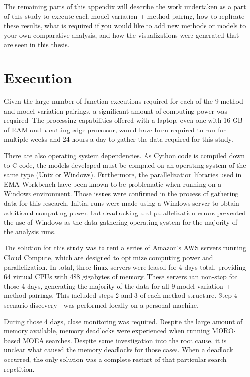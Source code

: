 The remaining parts of this appendix will describe the work undertaken as a part of this study to execute each model variation + method pairing, how to replicate these results, what is required if you would like to add new methods or models to your own comparative analysis, and how the visualizations were generated that are seen in this thesis. 

\section{Execution}
Given the large number of function executions required for each of the 9 method and model variation pairings, a significant amount of computing power was required. The processing capabilities offered with a laptop, even one with 16 GB of RAM and a cutting edge processor, would have been required to run for multiple weeks and 24 hours a day to gather the data required for this study. 

There are also operating system dependencies. As Cython code is compiled down to C code, the models developed must be compiled on an operating system of the same type (Unix or Windows). Furthermore, the parallelization libraries used in EMA Workbench have been known to be problematic when running on a Windows environment. Those issues were confirmed in the process of gathering data for this research. Initial runs were made using a Windows server to obtain additional computing power, but deadlocking and parallelization errors prevented the use of Windows as the data gathering operating system for the majority of the analysis runs. 

The solution for this study was to rent a series of Amazon's AWS servers running Cloud Compute, which are designed to optimize computing power and parallelization. In total, three linux servers were leased for 4 days total, providing 64 virtual CPUs with 488 gigabytes of memory. These servers ran non-stop for those 4 days, generating the majority of the data for all 9 model variation + method pairings. This included steps 2 and 3 of each method structure. Step 4 - scenario discovery - was performed locally on a personal machine. 

During those 4 days, close monitoring was required. Despite the large amount of memory available, memory deadlocks were experienced when running MORO-based MOEA searches. Despite some investigation into the root cause, it is unclear what caused the memory deadlocks for those cases. When a deadlock occurred, the only solution was a complete restart of that particular search repetition. 

